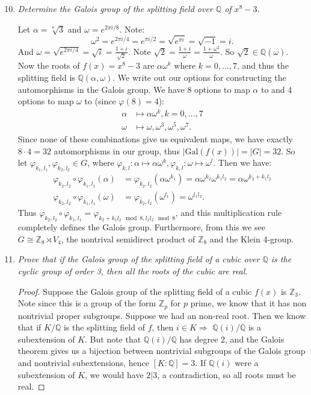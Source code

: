 \documentclass[10pt,oneside,reqno]{amsart}
\theoremstyle{plain}
\theoremstyle{definition}
\theoremstyle{remark}
\theoremstyle{plain}
\newcommand{\semi}{\rtimes}
\newcommand{\z}{\mathbb{Z}}
\newcommand{\Q}{\mathbb{Q}}
\newcommand{\bb}{\vspace{3mm}}
\newcommand{\bee}{\begin{equation}\begin{aligned}}
\newcommand{\eee}{\end{aligned}\end{equation}}
\newcommand{\fracc}{\frac}
\newcommand{\counter}{\setcounter}
\newcommand{\gal}{\text{Gal}}
\renewcommand{\phi}{\varphi}
\begin{document}
\begin{enumerate}[label=\arabic*.]
\counter{enumi}{9}

\item \textit{Determine the Galois group of the splitting field over $\Q$ of $x^8 - 3$. }

\bb

Let $\alpha = \sqrt[8]{3}$ and $\omega = e^{2\pi i/8}$. Note:
$$
\omega^2 = e^{2\pi i/4} = e^{\pi i/2} = \sqrt{e^{\pi i}} = \sqrt{-1} = i.
$$
And $\omega = \sqrt{e^{2\pi i / 4}} =\sqrt{i} = \fracc{1 + i}{\sqrt{2}}$.  Note $\sqrt{2} = \fracc{1 + i}{\omega} = \fracc{1 + \omega^2}{\omega}$. So $\sqrt{2} \in \Q(\omega)$. Now the roots of $f(x) = x^8 - 3$ are $\alpha\omega^k$ where $k = 0,...,7$, and thus the splitting field is $\Q(\alpha,\omega)$. We write out our options for constructing the automorphisms in the Galois group. We have 8 options to map $\alpha$ to and 4 options to map $\omega$ to (since $\phi(8) = 4$):
\bee
\alpha &\mapsto \alpha\omega^k, k = 0,...,7\\
\omega & \mapsto \omega,\omega^3,\omega^5,\omega^7.
\eee
Since none of these combinations give us equivalent maps, we have exactly $8\cdot 4 = 32$ automorphisms in our group, thus $|\gal(f(x))| = |G| = 32$. So let $\phi_{k_1,l_1},\phi_{k_2,l_2} \in G$, where $\phi_{k,l}:\alpha \mapsto \alpha\omega^k,\phi_{k,l}:\omega \mapsto \omega^l$. Then we have:
\bee
\phi_{k_2,l_2}\circ\phi_{k_1,l_1}(\alpha) &= \phi_{k_2,l_2}(\alpha\omega^{k_1}) = \alpha\omega^{k_2}\omega^{k_1l_2} = \alpha\omega^{k_2 + k_1l_2}\\
\phi_{k_2,l_2}\circ\phi_{k_1,l_1}(\omega) &= \phi_{k_2,l_2}(\omega^{l_1}) = \omega^{l_1l_2}.
\eee
Thus $\phi_{k_2,l_2}\circ\phi_{k_1,l_1} = \phi_{k_2 + k_1l_2 \mod 8,l_1l_2\mod 8}$, and this multiplication rule completely defines the Galois group. Furthermore, from this we see $G \cong \z_8 \semi V_4$, the nontrival semidirect product of $\z_8$ and the Klein 4-group. 

\counter{enumi}{12}

\item \textit{Prove that if the Galois group of the splitting field of a cubic over $\Q$ is the cyclic group of order 3, then all the roots of the cubic are real. }

\begin{proof}
Suppose the Galois group of the splitting field of a cubic $f(x)$ is $\z_3$. Note since this is a group of the form $\z_p$ for $p$ prime, we know that it has non nontrivial proper subgroups. Suppose we had an non-real root. Then we know that if $K/\Q$ is the splitting field of $f$, then $i \in K \Rightarrow$ $\Q(i)/\Q$ is a subextension of $K$. But note that $\Q(i)/\Q$ has degree 2, and the Galois theorem gives us a bijection between nontrivial subgroups of the Galois group and nontrivial subextensions, hence $[K:\Q] = 3$. If $\Q(i)$ were a subextension of $K$, we would have $2|3$, a contradiction, so all roots must be real. 
\end{proof}


\end{enumerate}
\end{document}
